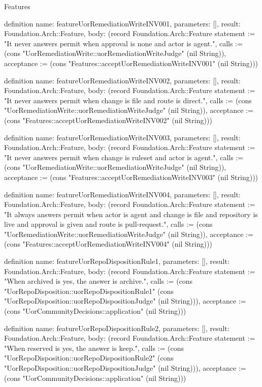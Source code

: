 \begin{lexlean}{Features}
\begin{semanticmodule}
definition{
  name: featureUorRemediationWriteINV001,
  parameters: [],
  result: Foundation.Arch::Feature,
  body: (record Foundation.Arch::Feature {statement := "It never answers permit when approval is none and actor is agent.", calls := (cons "UorRemediationWrite::uorRemediationWriteJudge" (nil String)), acceptance := (cons "Features::acceptUorRemediationWriteINV001" (nil String))})
}

definition{
  name: featureUorRemediationWriteINV002,
  parameters: [],
  result: Foundation.Arch::Feature,
  body: (record Foundation.Arch::Feature {statement := "It never answers permit when change is file and route is direct.", calls := (cons "UorRemediationWrite::uorRemediationWriteJudge" (nil String)), acceptance := (cons "Features::acceptUorRemediationWriteINV002" (nil String))})
}

definition{
  name: featureUorRemediationWriteINV003,
  parameters: [],
  result: Foundation.Arch::Feature,
  body: (record Foundation.Arch::Feature {statement := "It never answers permit when change is ruleset and actor is agent.", calls := (cons "UorRemediationWrite::uorRemediationWriteJudge" (nil String)), acceptance := (cons "Features::acceptUorRemediationWriteINV003" (nil String))})
}

definition{
  name: featureUorRemediationWriteINV004,
  parameters: [],
  result: Foundation.Arch::Feature,
  body: (record Foundation.Arch::Feature {statement := "It always answers permit when actor is agent and change is file and repository is live and approval is given and route is pull-request.", calls := (cons "UorRemediationWrite::uorRemediationWriteJudge" (nil String)), acceptance := (cons "Features::acceptUorRemediationWriteINV004" (nil String))})
}

definition{
  name: featureUorRepoDispositionRule1,
  parameters: [],
  result: Foundation.Arch::Feature,
  body: (record Foundation.Arch::Feature {statement := "When archived is yes, the answer is archive.", calls := (cons "UorRepoDisposition::uorRepoDispositionRule1" (cons "UorRepoDisposition::uorRepoDispositionJudge" (nil String))), acceptance := (cons "UorCommunityDecisions::application" (nil String))})
}

definition{
  name: featureUorRepoDispositionRule2,
  parameters: [],
  result: Foundation.Arch::Feature,
  body: (record Foundation.Arch::Feature {statement := "When reserved is yes, the answer is keep.", calls := (cons "UorRepoDisposition::uorRepoDispositionRule2" (cons "UorRepoDisposition::uorRepoDispositionJudge" (nil String))), acceptance := (cons "UorCommunityDecisions::application" (nil String))})
}


\end{semanticmodule}
\end{lexlean}
